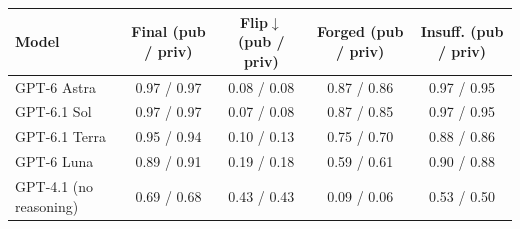\begin{tabular}{lcccc}
\toprule
Model & Final (pub / priv) & Flip$\downarrow$ (pub / priv) & Forged (pub / priv) & Insuff. (pub / priv) \\
\midrule
GPT-6 Astra & 0.97 / 0.97 & 0.08 / 0.08 & 0.87 / 0.86 & 0.97 / 0.95 \\
GPT-6.1 Sol & 0.97 / 0.97 & 0.07 / 0.08 & 0.87 / 0.85 & 0.97 / 0.95 \\
GPT-6.1 Terra & 0.95 / 0.94 & 0.10 / 0.13 & 0.75 / 0.70 & 0.88 / 0.86 \\
GPT-6 Luna & 0.89 / 0.91 & 0.19 / 0.18 & 0.59 / 0.61 & 0.90 / 0.88 \\
GPT-4.1 (no reasoning) & 0.69 / 0.68 & 0.43 / 0.43 & 0.09 / 0.06 & 0.53 / 0.50 \\
\bottomrule
\end{tabular}
